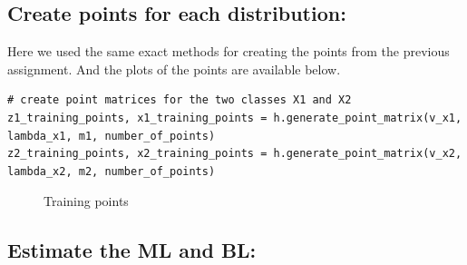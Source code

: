 \documentclass[11pt, oneside]{article}   	%
\begin{document}
\subsection{Create points for each distribution:}

Here we used the same exact methods for creating the points from the previous assignment.
And the plots of the points are available below.

\begin{lstlisting}[label={list:first},caption=points generation]
# create point matrices for the two classes X1 and X2
z1_training_points, x1_training_points = h.generate_point_matrix(v_x1, lambda_x1, m1, number_of_points)
z2_training_points, x2_training_points = h.generate_point_matrix(v_x2, lambda_x2, m2, number_of_points)
\end{lstlisting}

\begin{figure}
\begin{center}
\end{center}
\caption{Training points}
\end{figure}


\subsection{Estimate the ML and BL:}
\end{document}
